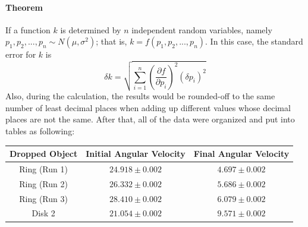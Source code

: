 \paragraph{Theorem}
If a function $k$ is determined by $n$ independent random variables, namely $p_1, p_2, ..., p_n\sim N(\mu, \sigma^2)$; that is, $k=f(p_1, p_2, ..., p_n)$. In this case, the standard error for $k$ is
\begin{equation}
  \delta k= \sqrt{\sum_{i=1}^n(\frac{\partial f}{\partial p_i})^2(\delta p_i)^2}
\end{equation}
Also, during the calculation, the results would be rounded-off to the same number of least decimal places when adding up different values whose decimal places are not the same. After that, all of the data were organized and put into tables as following:
\\
\begin{center}
  \begin{tabular}{|c|c|c|}
    \hline
    Dropped Object & Initial Angular Velocity & Final Angular Velocity \\
    \hline
    Ring (Run 1)   & $24.918\pm0.002$         & $4.697\pm0.002$        \\
    \hline
    Ring (Run 2)   & $26.332\pm0.002$         & $5.686\pm0.002$        \\
    \hline
    Ring (Run 3)   & $28.410\pm0.002$         & $6.079\pm0.002$        \\
    \hline
    Disk 2         & $21.054\pm0.002$         & $9.571\pm0.002$        \\
    \hline
  \end{tabular}
  \label{tab:ColData}
\end{center}
